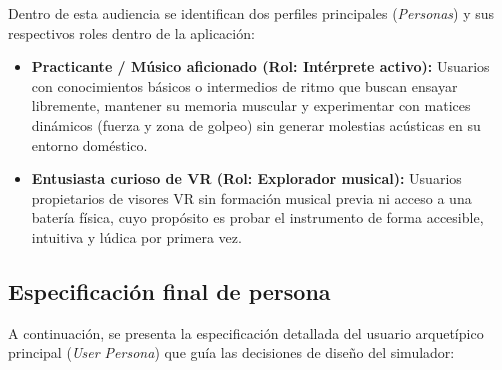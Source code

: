 \documentclass{article}
\begin{document}
Dentro de esta audiencia se identifican dos perfiles principales (\textit{Personas}) y sus respectivos roles dentro de la aplicación:
\begin{itemize}
    \item \textbf{Practicante / Músico aficionado (Rol: Intérprete activo):} Usuarios con conocimientos básicos o intermedios de ritmo que buscan ensayar libremente, mantener su memoria muscular y experimentar con matices dinámicos (fuerza y zona de golpeo) sin generar molestias acústicas en su entorno doméstico.
    \item \textbf{Entusiasta curioso de VR (Rol: Explorador musical):} Usuarios propietarios de visores VR sin formación musical previa ni acceso a una batería física, cuyo propósito es probar el instrumento de forma accesible, intuitiva y lúdica por primera vez.
\end{itemize}

\subsection{Especificación final de persona}
A continuación, se presenta la especificación detallada del usuario arquetípico principal (\textit{User Persona}) que guía las decisiones de diseño del simulador:
\end{document}
